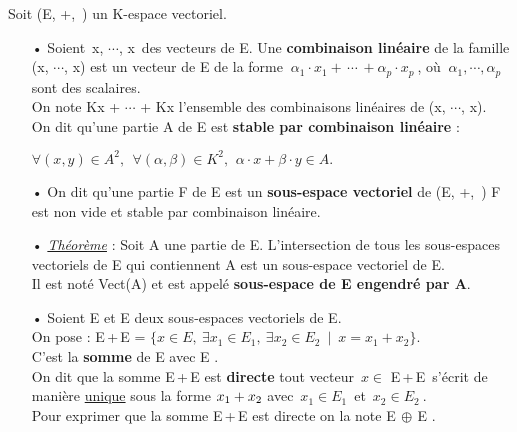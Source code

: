 \noindent Soit (E, +,\ \lce ) un K-espace vectoriel.
\vspace{-0.1cm}
\begin{itemize}[leftmargin=0.5cm]
    \item[•] Soient\, x, $\cdots$, x\, des vecteurs de E. Une \textbf{combinaison linéaire} de la famille (x, $\cdots$, x) est un vecteur de E de la forme \(\ \alpha_1 \cdot x_1 + \, \cdots \, + \alpha_p \cdot x_p\ \), où \(\ \alpha_1,\cdots, \alpha_p \) sont des scalaires. \vspace{0.1cm}\\
    On note Kx + \(\cdots\) + Kx l'ensemble des combinaisons linéaires de (x, $\cdots$, x).\vspace{0.2cm} \\
    On dit qu'une partie A de E est \textbf{stable par combinaison linéaire} \ssi :

    \hspace{4cm} \(\forall (x,y)\in A^2,\ \ \forall (\alpha,\beta) \in K^2,\ \,\alpha \cdot x+ \beta \cdot y \in A. \) \vspace{0.3cm}

    \item[•] On dit qu'une partie F de E est un \textbf{sous-espace vectoriel} de (E, +,\ \lce ) \ssi F est non vide et stable par combinaison linéaire.\vspace{0.3cm}

    \item[•] \underline{\emph{Théorème}} : Soit A une partie de E. L'intersection de tous les sous-espaces vectoriels de E qui contiennent A est un sous-espace vectoriel de E. \\
    Il est noté Vect(A) et est appelé \textbf{sous-espace de E engendré par A}.\vspace{0.3cm}

    \item[•] Soient E et E deux sous-espaces vectoriels de E. \vspace{0.1cm}\\
    On pose : E\,+\,E = \(\{ x\in E,\ \exists x_1 \in E_1,\ \exists x_2 \in E_2 \ \mid \ x = x_1 + x_2 \}. \)\vspace{0.1cm}\\
    C'est la \textbf{somme} de E avec E .\vspace{0.1cm} \\
    On dit que la somme E\,+\,E est \textbf{directe} \ssi tout vecteur \(\,x \in \) E\,+\,E\ s'écrit de manière \underline{unique} sous la forme  \(x\textsubscript{1} + x\textsubscript{2}\)  avec \(\, x_1 \in  E_1\, \) et \(\, x_2 \in  E_2\ \).\vspace{0.1cm}\\ 
    Pour exprimer que la somme E\,+\,E est directe on la note E\(\,\oplus\,\)E . \vspace{0.3cm}


\end{itemize}
